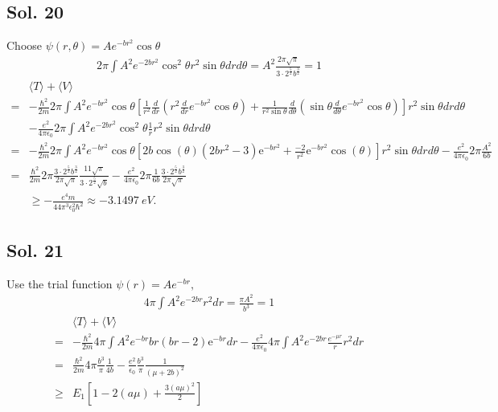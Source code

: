\subsection*{Sol. 20}
Choose $\psi(r,\theta)=Ae^{-br^2}\cos\theta$
\begin{align*}
    2\pi\int A^2e^{-2br^2}\cos^2\theta r^2\sin\theta
    drd\theta = 
    A^{2}
    \frac{2\pi\sqrt{\pi}}{3 \cdot 2^{\frac{5}{2}} b^{\frac{3}{2}}}=1
\end{align*}
\begin{align*}
    &\langle T \rangle + \langle V\rangle\\
    =&
    -\frac{\hbar^2}{2m}2\pi
    \int 
    A^2 e^{-br^2}\cos\theta 
    \left[
    \frac{1}{r^2}\frac{d}{dr}(r^2\frac{d}{dr}e^{-br^2}\cos\theta)
    +\frac{1}{r^2\sin\theta }
    \frac{d}{d\theta}(\sin\theta \frac{d}{d\theta}e^{-br^2}\cos\theta)
    \right]
    r^2\sin\theta drd\theta \\
    & 
    -\frac{e^2}{4\pi\epsilon_0}
    2\pi 
    \int A^2e^{-2br^2}\cos^2\theta \frac{1}{r}r^2\sin\theta drd\theta \\
    =&
    -\frac{\hbar^2}{2m}2\pi
    \int 
    A^2 e^{-br^2}\cos\theta 
    \left[
    2b \cos\left({\theta}\right)\left(2br^{2} - 3\right) \mathrm{e}^{-br^{2}}
    +\frac{-2}{r^2 }
    \mathrm{e}^{-br^{2}} \cos\left({\theta}\right) 
    \right]
    r^2\sin\theta drd\theta 
    -\frac{e^2}{4\pi\epsilon_0}
    2\pi 
    \frac{A^{2}}{6b}\\
    =&
    \frac{\hbar^2}{2m}2\pi 
    \frac{3 \cdot 2^{\frac{5}{2}} b^{\frac{3}{2}}}{2\pi\sqrt{\pi}}
    \frac{11 \sqrt{\pi}}{3 \cdot 2^{\frac{5}{2}} \sqrt{b}}
    -\frac{e^2}{4\pi\epsilon_0}
    2\pi 
    \frac{1}{6b}
    \frac{3 \cdot 2^{\frac{5}{2}} b^{\frac{3}{2}}}{2\pi\sqrt{\pi}}\\
    &\geq 
     - \frac{e^{4} m}{44 \pi^{3} \epsilon_{0}^{2} \hbar^{2}}\approx 
    -\qty{3.1497}{eV}.
\end{align*}

\subsection*{Sol. 21}
Use the trial function $\psi(r)=Ae^{-br},$
\begin{align*}
    4\pi\int A^2e^{-2br}r^2dr=\frac{\pi A^{2}}{b^{3}}=1
\end{align*}
\begin{align*}
    &\langle T\rangle + \langle V\rangle\\
    =&
    -\frac{\hbar^2}{2m}4\pi 
    \int A^2
    e^{-br}br \left(br - 2\right) \mathrm{e}^{-br}dr
    -\frac{e^2}{4\pi\epsilon_0}
    4\pi\int A^2
    e^{-2br}\frac{e^{-\mu r}}{r}r^2dr\\
    =&
    \frac{\hbar^2}{2m}4\pi \frac{b^3}{\pi}\frac{1}{4b}
    -\frac{e^2}{\epsilon_0}\frac{b^3}{\pi}\frac{1}{\left({\mu} + 2b\right)^{2}}\\
    \geq &
      E_1\left[1-2(a\mu) +\frac{3 (a\mu)^{2}}{2}\right]
\end{align*}



